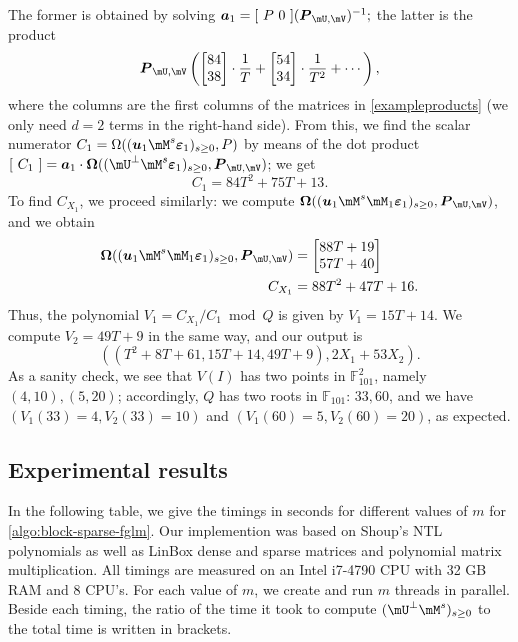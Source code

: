\documentclass[12pt]{article}
\newcommand{\mat}[1]{\bm{\MakeUppercase{#1}}} %
\newcommand{\row}[1]{\bm{\MakeLowercase{#1}}} %
\newcommand{\col}[1]{\bm{\MakeLowercase{#1}}} %
\newcommand{\minpoly}{P}
\newcommand{\sqfree}{Q}
\def\F {\ensuremath{\mathbb{F}}}
\begin{document}
The former is obtained by solving $\row{a}_1 = [~P~0~] (\mat{P}_{\mU,\mV})^{-1};$
the latter is the product
$$\mat{P}_{\mU,\mV} 
\left (
\begin{bmatrix}
84\\  
38
\end{bmatrix}\cdot \frac 1T+
\begin{bmatrix}
54\\  
34
\end{bmatrix}\cdot \frac 1{T^2}+
 \cdots \right),$$ where the columns are the first columns of the
 matrices in \cref{exampleproducts} (we only need $d=2$
 terms in the right-hand side).  From this, we find the scalar
 numerator $C_1 = \Omega((\row{u}_1 \mM^s\col{\varepsilon}_1)_{s \ge
   0}, \minpoly)$ by means of the dot product $[~C_1~] = \row{a}_1\cdot
 \mat{\Omega}( (\mU^\perp \mM^s\col{\varepsilon}_1)_{s \ge 0},
 \mat{P}_{\mU,\mV})$; we get
$$ C_1 = 84T^2 + 75T + 13.$$
To find $C_{X_1}$, we proceed similarly: we compute  $\mat{\Omega}( (\row{u}_1 \mM^s \mM_1\col{\varepsilon}_1)_{s \ge 0}, \mat{P}_{\mU,\mV})$,
and we obtain
\begin{align*}
\mat{\Omega}( (\row{u}_1 \mM^s \mM_1\col{\varepsilon}_1)_{s \ge 0}, \mat{P}_{\mU,\mV}) &=
\left [\begin{matrix} 88T + 19 \\ 57T+40
  \end{matrix} \right  ]\\
C_{X_1} &= 88T^2 + 47T  + 16.
\end{align*}
Thus, the polynomial $V_1 = C_{X_1}/C_1 \bmod \sqfree$ is 
given by $V_1= 15T+14$. 
We compute $V_2= 49T+9$ in the same way,
and our output is 
$$((T^2+8T+61, 15T+14, 49T+9), 2X_1 + 53 X_2).$$ 
As a sanity check, we see that
$V( I)$ has two points in $\F_{101}^2$, namely $(4,10),(5,20)$;
accordingly, $Q$ has two roots
in $\F_{101}$: $33,60$, and we have $(V_1(33) = 4, V_2(33) = 10)$
and $(V_1(60) = 5, V_2(60) = 20)$, as
expected.


\subsection{Experimental results}\label{section:ex}

In the following table, we give the timings in seconds for different
values of $m$ for \cref{algo:block-sparse-fglm}.  Our
implemention was based on Shoup's NTL \cite{NTL} polynomials
as well as LinBox \cite{LinBox} dense and sparse
matrices and polynomial matrix multiplication. All timings are
measured on an Intel i7-4790 CPU with 32 GB RAM and 8 CPU's. For each
value of $m$, we create and run $m$ threads in parallel. Beside each
timing, the ratio of the time it took to compute $(\mU^{\perp}
\mM^s)_{s\ge0}$ to the total time is written in brackets.
\end{document}
